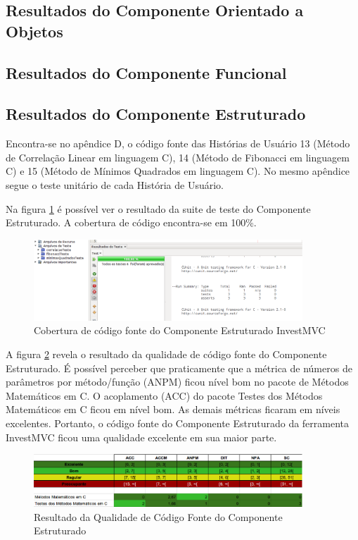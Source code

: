 \subsection{Resultados do Componente Orientado a Objetos}
\subsection{Resultados do Componente Funcional}
\subsection{Resultados do Componente Estruturado}

Encontra-se no apêndice D,  o código fonte das Histórias de Usuário 13 (Método de Correlação Linear em linguagem C), 14 (Método de Fibonacci em linguagem C) e 15 (Método de Mínimos Quadrados em linguagem C). No mesmo apêndice segue o teste unitário de cada História de Usuário.

Na figura \ref{coberturaEstrturado} é possível ver o resultado da suite de teste do Componente Estruturado. A cobertura de código encontra-se em 100\%.

\begin{figure}[htp]
\centering
\includegraphics[width=0.9\textwidth]{figuras/coberturaEstruturado}
\caption{Cobertura de código fonte do Componente Estruturado InvestMVC}
\label{coberturaEstrturado}
\end{figure}

A figura \ref{qualidadeEstruturado} revela o resultado da qualidade de código fonte do Componente Estruturado. É possível perceber que praticamente que a métrica de números de parâmetros por método/função (ANPM) ficou nível bom no pacote de Métodos Matemáticos em C. O acoplamento (ACC) do pacote Testes dos Métodos Matemáticos em C ficou em nível bom. As demais métricas ficaram em níveis excelentes. Portanto, o código fonte do Componente Estruturado da  ferramenta InvestMVC ficou uma qualidade excelente em sua maior parte.

\begin{figure}[htp]
\centering
\includegraphics[width=0.9\textwidth]{figuras/qualidadeEstruturado}
\caption{Resultado da Qualidade de Código Fonte do Componente Estruturado} 
\label{qualidadeEstruturado}
\end{figure}

